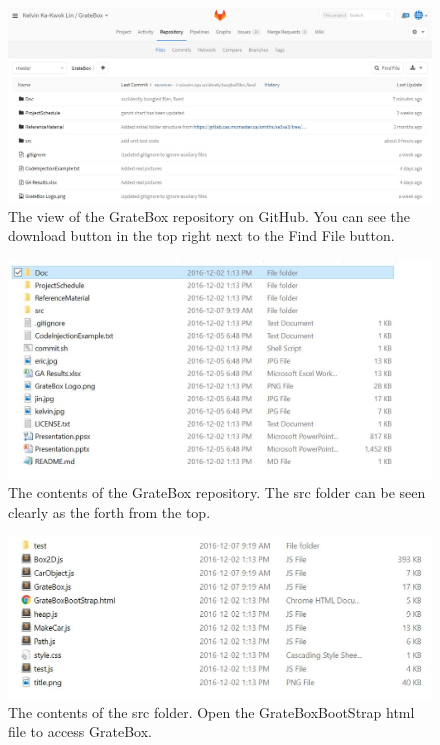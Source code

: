 \documentclass{article}
\begin{document}
\begin{figure}
  \includegraphics[width=\linewidth]{Images/GrateBoxGitRep.JPG}
  \caption{The view of the GrateBox repository on GitHub. You can see the download button in the top right next to the Find File button.}
  \label{fig:GitRep1}
\end{figure}

\begin{figure}
  \includegraphics[width=\linewidth]{Images/GrateBoxGitRep2.JPG}
  \caption{The contents of the GrateBox repository. The src folder can be seen clearly as the forth from the top.}
  \label{fig:GitRep2}
\end{figure}

\begin{figure}
  \includegraphics[width=\linewidth]{Images/GrateBoxGitRep3.JPG}
  \caption{The contents of the src folder. Open the GrateBoxBootStrap html file to access GrateBox.}
  \label{fig:GitRep3}
\end{figure}
\end{document}
